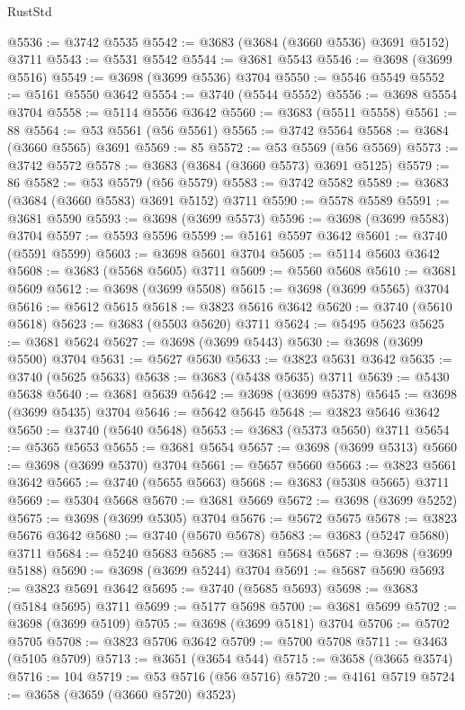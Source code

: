 \begin{lexlean}{RustStd}
\begin{coremodule}
{\begin{coremodule}
{{{{{{{{{{{{{{{{{{{{{{{{{{{{{{{{{{{{{{{{{{{{{{{@5536 := @3742 @5535
@5542 := @3683 (@3684 (@3660 @5536) @3691 @5152) @3711
@5543 := @5531 @5542
@5544 := @3681 @5543
@5546 := @3698 (@3699 @5516)
@5549 := @3698 (@3699 @5536) @3704
@5550 := @5546 @5549
@5552 := @5161 @5550 @3642
@5554 := @3740 (@5544 @5552)
@5556 := @3698 @5554 @3704
@5558 := @5114 @5556 @3642
@5560 := @3683 (@5511 @5558)
@5561 := 88
@5564 := @53 @5561 (@56 @5561)
@5565 := @3742 @5564
@5568 := @3684 (@3660 @5565) @3691
@5569 := 85
@5572 := @53 @5569 (@56 @5569)
@5573 := @3742 @5572
@5578 := @3683 (@3684 (@3660 @5573) @3691 @5125)
@5579 := 86
@5582 := @53 @5579 (@56 @5579)
@5583 := @3742 @5582
@5589 := @3683 (@3684 (@3660 @5583) @3691 @5152) @3711
@5590 := @5578 @5589
@5591 := @3681 @5590
@5593 := @3698 (@3699 @5573)
@5596 := @3698 (@3699 @5583) @3704
@5597 := @5593 @5596
@5599 := @5161 @5597 @3642
@5601 := @3740 (@5591 @5599)
@5603 := @3698 @5601 @3704
@5605 := @5114 @5603 @3642
@5608 := @3683 (@5568 @5605) @3711
@5609 := @5560 @5608
@5610 := @3681 @5609
@5612 := @3698 (@3699 @5508)
@5615 := @3698 (@3699 @5565) @3704
@5616 := @5612 @5615
@5618 := @3823 @5616 @3642
@5620 := @3740 (@5610 @5618)
@5623 := @3683 (@5503 @5620) @3711
@5624 := @5495 @5623
@5625 := @3681 @5624
@5627 := @3698 (@3699 @5443)
@5630 := @3698 (@3699 @5500) @3704
@5631 := @5627 @5630
@5633 := @3823 @5631 @3642
@5635 := @3740 (@5625 @5633)
@5638 := @3683 (@5438 @5635) @3711
@5639 := @5430 @5638
@5640 := @3681 @5639
@5642 := @3698 (@3699 @5378)
@5645 := @3698 (@3699 @5435) @3704
@5646 := @5642 @5645
@5648 := @3823 @5646 @3642
@5650 := @3740 (@5640 @5648)
@5653 := @3683 (@5373 @5650) @3711
@5654 := @5365 @5653
@5655 := @3681 @5654
@5657 := @3698 (@3699 @5313)
@5660 := @3698 (@3699 @5370) @3704
@5661 := @5657 @5660
@5663 := @3823 @5661 @3642
@5665 := @3740 (@5655 @5663)
@5668 := @3683 (@5308 @5665) @3711
@5669 := @5304 @5668
@5670 := @3681 @5669
@5672 := @3698 (@3699 @5252)
@5675 := @3698 (@3699 @5305) @3704
@5676 := @5672 @5675
@5678 := @3823 @5676 @3642
@5680 := @3740 (@5670 @5678)
@5683 := @3683 (@5247 @5680) @3711
@5684 := @5240 @5683
@5685 := @3681 @5684
@5687 := @3698 (@3699 @5188)
@5690 := @3698 (@3699 @5244) @3704
@5691 := @5687 @5690
@5693 := @3823 @5691 @3642
@5695 := @3740 (@5685 @5693)
@5698 := @3683 (@5184 @5695) @3711
@5699 := @5177 @5698
@5700 := @3681 @5699
@5702 := @3698 (@3699 @5109)
@5705 := @3698 (@3699 @5181) @3704
@5706 := @5702 @5705
@5708 := @3823 @5706 @3642
@5709 := @5700 @5708
@5711 := @3463 (@5105 @5709)
@5713 := @3651 (@3654 @544)
@5715 := @3658 (@3665 @3574)
@5716 := 104
@5719 := @53 @5716 (@56 @5716)
@5720 := @4161 @5719
@5724 := @3658 (@3659 (@3660 @5720) @3523)
}}}}}}}}}}}}}}}}}}}}}}}}}}}}}}}}}}}}}}}}}}}}}}}
\end{coremodule}}
\end{coremodule}
\end{lexlean}
